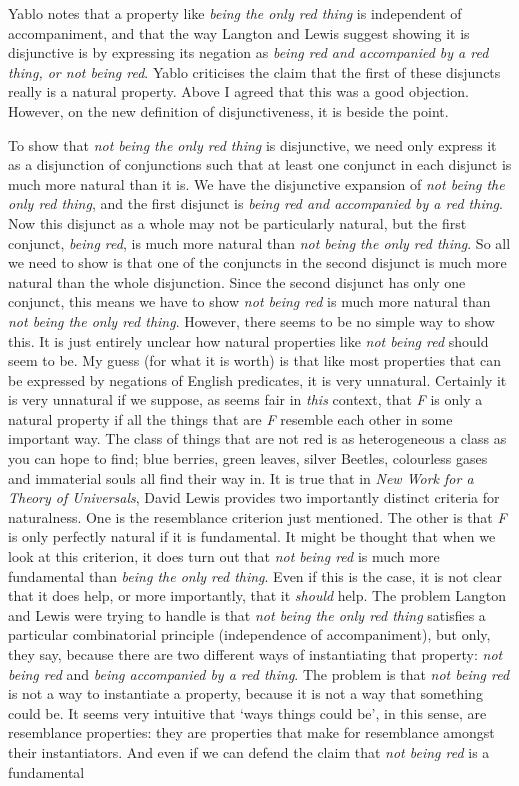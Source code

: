 Yablo notes that a property like \textit{being the only red thing} is independent of accompaniment, and that the way Langton and Lewis suggest showing it is disjunctive is by expressing its negation as \textit{being red and accompanied by a red thing, or not being red}. Yablo criticises the claim that the first of these disjuncts really is a natural property. Above I agreed that this was a good objection. However, on the new definition of disjunctiveness, it is beside the point. 

To show that \textit{not being the only red thing} is disjunctive, we need only express it as a disjunction of conjunctions such that at least one conjunct in each disjunct is much more natural than it is. We have the disjunctive expansion of \textit{not being the only red thing}, and the first disjunct is \textit{being red and accompanied by a red thing}. Now this disjunct as a whole may not be particularly natural, but the first conjunct, \textit{being red}, is much more natural than \textit{not being the only red thing}. So all we need to show is that one of the conjuncts in the second disjunct is much more natural than the whole disjunction. Since the second disjunct has only one conjunct, this means we have to show \textit{not being red }is much more natural than \textit{not being the only red thing}. However, there seems to be no simple way to show this. It is just entirely unclear how natural properties like \textit{not being red} should seem to be. My guess (for what it is worth) is that like most properties that can be expressed by negations of English predicates, it is very unnatural. Certainly it is very unnatural if we suppose, as seems fair in \textit{this} context, that \textit{F} is only a natural property if all the things that are \textit{F} resemble each other in some important way. The class of things that are not red is as heterogeneous a class as you can hope to find; blue berries, green leaves, silver Beetles, colourless gases and immaterial souls all find their way in. It is true that in \textit{New Work for a Theory of Universals}, David Lewis provides two importantly distinct criteria for naturalness. One is the resemblance criterion just mentioned. The other is that \textit{F} is only perfectly natural if it is fundamental. It might be thought that when we look at this criterion, it does turn out that \textit{not being red} is much more fundamental than \textit{being the only red thing}. Even if this is the case, it is not clear that it does help, or more importantly, that it \textit{should} help. The problem Langton and Lewis were trying to handle is that \textit{not being the only red thing} satisfies a particular combinatorial principle (independence of accompaniment), but only, they say, because there are two different ways of instantiating that property: \textit{not being red} and \textit{being accompanied by a red thing}. The problem is that \textit{not being red} is not a way to instantiate a property, because it is not a way that something could be. It seems very intuitive that `ways things could be', in this sense, are resemblance properties: they are properties that make for resemblance amongst their instantiators. And even if we can defend the claim that \textit{not being red} is a fundamental 